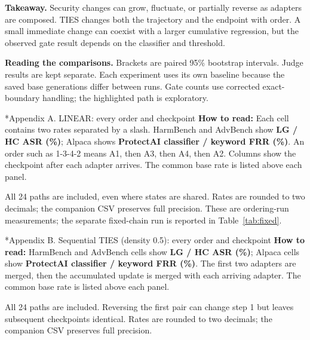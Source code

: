 \documentclass[10pt,a4paper,twocolumn]{article}
\makeatletter
\renewcommand\section{\@startsection{section}{1}{\z@}{-1.5ex plus -.2ex}{.6ex}{\normalfont\large\bfseries}}
\makeatother
\begin{document}
\textbf{Takeaway.} Security changes can grow, fluctuate, or partially reverse as adapters are composed. TIES changes both the trajectory and the endpoint with order. A small immediate change can coexist with a larger cumulative regression, but the observed gate result depends on the classifier and threshold.

{\small\textbf{Reading the comparisons.} Brackets are paired 95\% bootstrap intervals. Judge results are kept separate. Each experiment uses its own baseline because the saved base generations differ between runs. Gate counts use corrected exact-boundary handling; the highlighted path is exploratory.}

\clearpage
\onecolumn
\begin{landscape}
\section*{Appendix A. LINEAR: every order and checkpoint}
\textbf{How to read:} Each cell contains two rates separated by a slash. HarmBench and AdvBench show \textbf{LG / HC ASR (\%)};
Alpaca shows \textbf{ProtectAI classifier / keyword FRR (\%)}. An order such as 1-3-4-2 means A1, then A3, then A4, then A2.
Columns show the checkpoint after each adapter arrives. The common base rate is listed above each panel.

\vspace{6pt}
\noindent

\vspace{8pt}
{\small All 24 paths are included, even where states are shared. Rates are rounded to two decimals; the companion CSV preserves full precision.
These are ordering-run measurements; the separate fixed-chain run is reported in Table~\ref{tab:fixed}.}

\newpage
\section*{Appendix B. Sequential TIES (density 0.5): every order and checkpoint}
\textbf{How to read:} HarmBench and AdvBench cells show \textbf{LG / HC ASR (\%)};
Alpaca cells show \textbf{ProtectAI classifier / keyword FRR (\%)}.
The first two adapters are merged, then the accumulated update is merged with each arriving adapter. The common base rate is listed above each panel.

\vspace{6pt}
\noindent

\vspace{8pt}
{\small All 24 paths are included. Reversing the first pair can change step 1 but leaves subsequent checkpoints identical.
Rates are rounded to two decimals; the companion CSV preserves full precision.}
\end{landscape}
\end{document}
